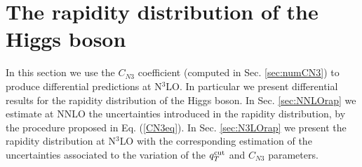 \documentclass[12pt]{article}
\begin{document}
\section{The rapidity distribution of the Higgs boson}
\label{sec:rapgen}
In this section we use the $C_{N3}$ coefficient (computed in Sec. \ref{sec:numCN3}) to produce differential predictions at N$^{3}$LO. In particular we present differential results for the rapidity distribution of the Higgs boson. In Sec. \ref{sec:NNLOrap}  we estimate at NNLO the uncertainties introduced in the rapidity distribution, by the procedure proposed in Eq. (\ref{CN3eq}). In Sec. \ref{sec:N3LOrap} we present the rapidity distribution at N$^{3}$LO with the corresponding estimation of the uncertainties associated to the variation of the $q_{T}^{\rm cut}$ and $C_{N3}$ parameters.
\end{document}
